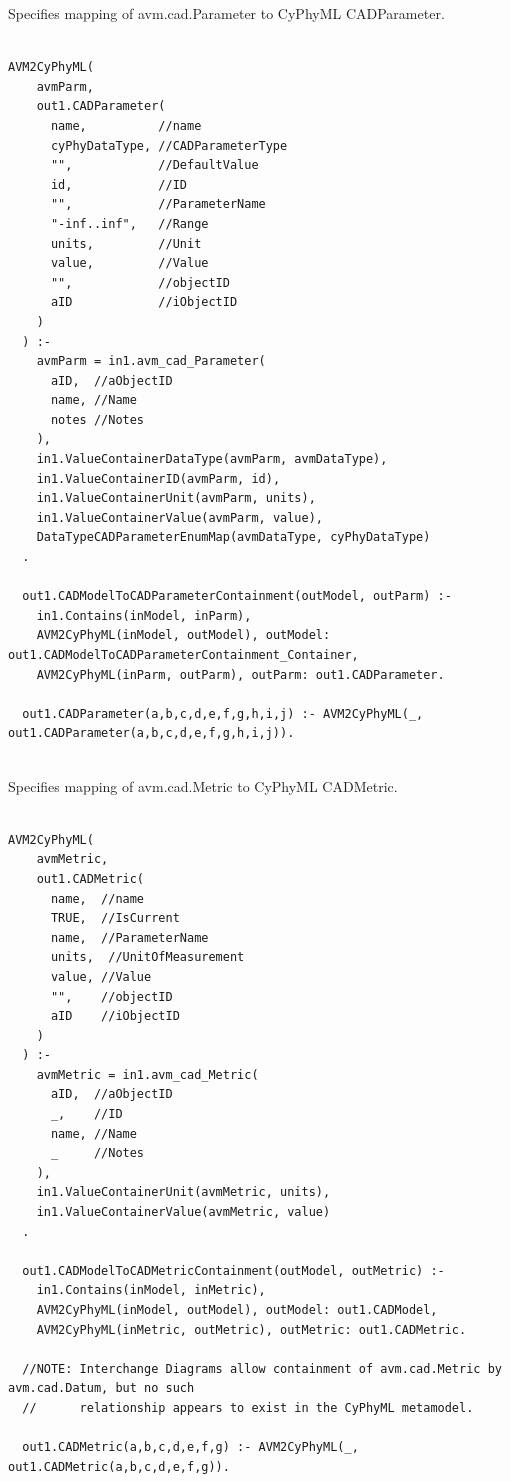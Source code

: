 Specifies mapping of avm.cad.Parameter to CyPhyML CADParameter.
\begin{lstlisting}

AVM2CyPhyML(
    avmParm,
    out1.CADParameter(
      name,          //name
      cyPhyDataType, //CADParameterType
      "",            //DefaultValue
      id,            //ID
      "",            //ParameterName
      "-inf..inf",   //Range
      units,         //Unit
      value,         //Value
      "",            //objectID
      aID            //iObjectID
    )
  ) :-
    avmParm = in1.avm_cad_Parameter(
      aID,  //aObjectID
      name, //Name
      notes //Notes
    ),
    in1.ValueContainerDataType(avmParm, avmDataType),
    in1.ValueContainerID(avmParm, id),
    in1.ValueContainerUnit(avmParm, units),
    in1.ValueContainerValue(avmParm, value),
    DataTypeCADParameterEnumMap(avmDataType, cyPhyDataType)
  .

  out1.CADModelToCADParameterContainment(outModel, outParm) :-
    in1.Contains(inModel, inParm),
    AVM2CyPhyML(inModel, outModel), outModel: out1.CADModelToCADParameterContainment_Container,
    AVM2CyPhyML(inParm, outParm), outParm: out1.CADParameter.

  out1.CADParameter(a,b,c,d,e,f,g,h,i,j) :- AVM2CyPhyML(_, out1.CADParameter(a,b,c,d,e,f,g,h,i,j)).


\end{lstlisting}

Specifies mapping of avm.cad.Metric to CyPhyML CADMetric.
\begin{lstlisting}

AVM2CyPhyML(
    avmMetric,
    out1.CADMetric(
      name,  //name
      TRUE,  //IsCurrent
      name,  //ParameterName
      units,  //UnitOfMeasurement
      value, //Value
      "",    //objectID
      aID    //iObjectID
    )
  ) :-
    avmMetric = in1.avm_cad_Metric(
      aID,  //aObjectID
      _,    //ID
      name, //Name
      _     //Notes
    ),
    in1.ValueContainerUnit(avmMetric, units),
    in1.ValueContainerValue(avmMetric, value)
  .

  out1.CADModelToCADMetricContainment(outModel, outMetric) :-
    in1.Contains(inModel, inMetric),
    AVM2CyPhyML(inModel, outModel), outModel: out1.CADModel,
    AVM2CyPhyML(inMetric, outMetric), outMetric: out1.CADMetric.

  //NOTE: Interchange Diagrams allow containment of avm.cad.Metric by avm.cad.Datum, but no such
  //      relationship appears to exist in the CyPhyML metamodel.

  out1.CADMetric(a,b,c,d,e,f,g) :- AVM2CyPhyML(_, out1.CADMetric(a,b,c,d,e,f,g)).


\end{lstlisting}

